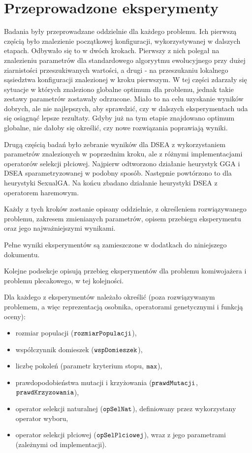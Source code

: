 \documentclass[./FM_mgr.tex]{subfiles}
\begin{document}
\section{Przeprowadzone eksperymenty}

Badania były przeprowadzane oddzielnie dla każdego problemu.
Ich pierwszą częścią było znalezienie początkowej konfiguracji, wykorzystywanej w dalszych etapach.
Odbywało się to w dwóch krokach.
Pierwszy z nich polegał na znalezieniu parametrów dla standardowego algoryytmu ewolucyjnego przy dużej ziarnistości przeszukiwanych wartości, a drugi - na przeszukaniu lokalnego sąsiedztwa konfiguracji znalezionej w kroku pierwszym.
W tej części zdarzały się sytuacje w których znaleziono globalne optimum dla problemu, jednak takie zestawy parametrów zostawały odrzucone.
Miało to na celu uzyskanie wyników dobrych, ale nie najlepszych, aby sprawdzić, czy w dalszych eksperymentach uda się osiągnąć lepsze rezultaty.
Gdyby już na tym etapie znajdowano optimum globalne, nie dałoby się określić, czy nowe rozwiązania poprawiają wyniki.

Drugą częścią badań było zebranie wyników dla DSEA z wykorzystaniem parametrów znalezionych w poprzednim kroku, ale z różnymi implementacjami operatorów selekcji płciowej. 
Najpierw odtworzono działanie heurystyk GGA i DSEA sparametryzowanej w podobny sposób. Następnie powtórzono to dla heurystyki SexualGA. 
Na końcu zbadano działanie heurystyki DSEA z operatorem haremowym.

Każdy z tych kroków zostanie opisany oddzielnie, z określeniem rozwiązywanego problemu, zakresem zmienianych parametrów, opisem przebiegu eksperymentu oraz jego najważniejszymi wynikami.

Pełne wyniki eksperymentów są zamieszczone w dodatkach do niniejszego dokumentu.

Kolejne podsekcje opisują przebieg eksperymentów dla problemu komiwojażera i problemu plecakowego, w tej kolejności.

Dla każdego z eksperymentów należało określić (poza rozwiązywanym problemem, a więc reprezentacją osobnika, operatorami genetycznymi i funkcją oceny):

\begin{itemize}
	\item rozmiar populacji ($\mathtt{rozmiarPopulacji}$),
	\item współczynnik domieszek ($\mathtt{wspDomieszek}$),
	\item liczbę pokoleń (parametr kryterium stopu, $\mathtt{max}$),
	\item prawdopodobieństwa mutacji i krzyżowania ($\mathtt{prawdMutacji}$, $\mathtt{prawdKrzyzowania}$),
	\item operator selekcji naturalnej ($\mathtt{opSelNat}$), definiowany przez wykorzystany operator wyboru,
	\item operator selekcji płciowej ($\mathtt{opSelPlciowej}$), wraz z jego parametrami (zależnymi od implementacji).
\end{itemize}
\end{document}

